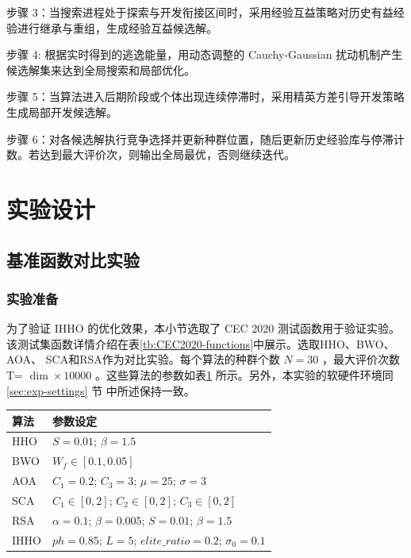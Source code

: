 \documentclass{wzuthesis}
\begin{document}
步骤 3：当搜索进程处于探索与开发衔接区间时，采用经验互益策略对历史有益经验进行继承与重组，生成经验互益候选解。

步骤 4: 根据实时得到的逃逸能量，用动态调整的 Cauchy-Gaussian 扰动机制产生候选解集来达到全局搜索和局部优化。

步骤 5：当算法进入后期阶段或个体出现连续停滞时，采用精英方差引导开发策略生成局部开发候选解。

步骤 6：对各候选解执行竞争选择并更新种群位置，随后更新历史经验库与停滞计数。若达到最大评价次，则输出全局最优，否则继续迭代。


\section{实验设计}


\subsection{基准函数对比实验}

\subsubsection{实验准备}
为了验证 IHHO 的优化效果，本小节选取了 CEC 2020 测试函数用于验证实验。该测试集函数详情介绍在表\ref{tb:CEC2020-functions}中展示。选取HHO、BWO、AOA、 SCA和RSA作为对比实验。每个算法的种群个数 $N = {30}$ ，最大评价次数 T= $\dim  \times  {10000}$ 。这些算法的参数如表\ref{tb:IHHO-parameters} 所示。另外，本实验的软硬件环境同\ref{sec:exp-settings} 节
中所述保持一致。
\begin{table}[htbp]
\centering
\small
{}
\begin{tabular}{ll}
\toprule
\textbf{算法} & \textbf{参数设定} \\
\midrule
HHO & $S = 0.01$; $\beta = 1.5$ \\
BWO & $W_f \in [0.1, 0.05]$ \\
AOA & $C_1 = 0.2$; $C_3 = 3$; $\mu = 25$; $\sigma = 3$ \\
SCA & $C_1 \in [0,2]$; $C_2 \in [0,2]$; $C_3 \in [0,2]$ \\
RSA & $\alpha = 0.1$; $\beta = 0.005$; $S = 0.01$; $\beta = 1.5$ \\
IHHO & $ph = 0.85$; $L = 5$; $elite\_ratio = 0.2$; $\sigma_0 = 0.1$ \\
\bottomrule
\end{tabular}
\label{tb:IHHO-parameters}
\end{table}
\end{document}
